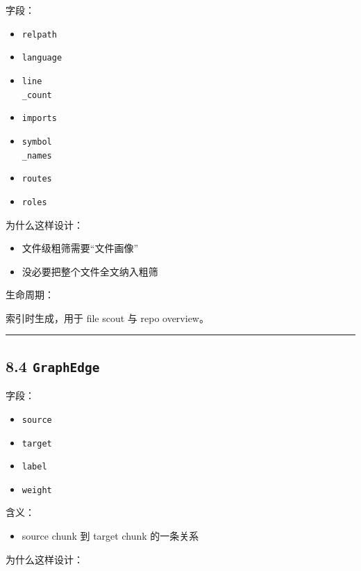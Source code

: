 \documentclass[UTF8,12pt,openany]{ctexbook}
\begin{document}
字段：\par

\begin{itemize}
\item \texttt{relpath}
\item \texttt{language}
\item \texttt{line\\_count}
\item \texttt{imports}
\item \texttt{symbol\\_names}
\item \texttt{routes}
\item \texttt{roles}
\end{itemize}

为什么这样设计：\par

\begin{itemize}
\item 文件级粗筛需要“文件画像”
\item 没必要把整个文件全文纳入粗筛
\end{itemize}

生命周期：\par

索引时生成，用于 file scout 与 repo overview。\par

\hrule

\subsection{8.4 \texttt{GraphEdge}}

字段：\par

\begin{itemize}
\item \texttt{source}
\item \texttt{target}
\item \texttt{label}
\item \texttt{weight}
\end{itemize}

含义：\par

\begin{itemize}
\item source chunk 到 target chunk 的一条关系
\end{itemize}

为什么这样设计：\par
\end{document}
